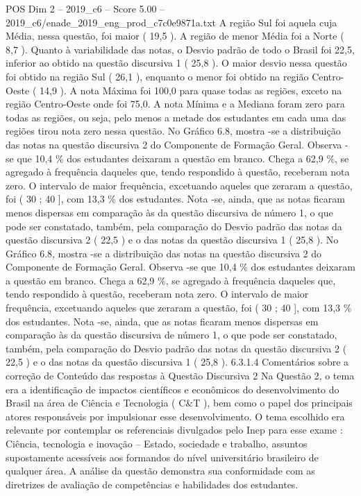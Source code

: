 \begin{textsample}{POS Dim 2 – 2019\_c6 – Score 5.00 – 2019\_c6/enade\_2019\_eng\_prod\_c7c0e9871a.txt}
A região Sul foi aquela cuja Média, nessa questão, foi maior ( 19,5 ).
A região de menor Média foi a Norte ( 8,7 ).
Quanto à variabilidade das notas, o Desvio padrão de todo o Brasil foi 22,5, inferior ao obtido na questão discursiva 1 ( 25,8 ).
O maior desvio nessa questão foi obtido na região Sul ( 26,1 ), enquanto o menor foi obtido na região Centro-Oeste ( 14,9 ).
A nota Máxima foi 100,0 para quase todas as regiões, exceto na região Centro-Oeste onde foi 75,0.
A nota Mínima e a Mediana foram zero para todas as regiões, ou seja, pelo menos a metade dos estudantes em cada uma das regiões tirou nota zero nessa questão.
No Gráfico 6.8, mostra -se a distribuição das notas na questão discursiva 2 do Componente de Formação Geral.
Observa -se que 10,4 \% dos estudantes deixaram a questão em branco.
Chega a 62,9 \%, se agregado à frequência daqueles que, tendo respondido à questão, receberam nota zero.
O intervalo de maior frequência, excetuando aqueles que zeraram a questão, foi ( 30 ; 40 ], com 13,3 \% dos estudantes.
Nota -se, ainda, que as notas ficaram menos dispersas em comparação às da questão discursiva de número 1, o que pode ser constatado, também, pela comparação do Desvio padrão das notas da questão discursiva 2 ( 22,5 ) e o das notas da questão discursiva 1 ( 25,8 ).
No Gráfico 6.8, mostra -se a distribuição das notas na questão discursiva 2 do Componente de Formação Geral.
Observa -se que 10,4 \% dos estudantes deixaram a questão em branco.
Chega a 62,9 \%, se agregado à frequência daqueles que, tendo respondido à questão, receberam nota zero.
O intervalo de maior frequência, excetuando aqueles que zeraram a questão, foi ( 30 ; 40 ], com 13,3 \% dos estudantes.
Nota -se, ainda, que as notas ficaram menos dispersas em comparação às da questão discursiva de número 1, o que pode ser constatado, também, pela comparação do Desvio padrão das notas da questão discursiva 2 ( 22,5 ) e o das notas da questão discursiva 1 ( 25,8 ). 6.3.1.4 Comentários sobre a correção de Conteúdo das respostas à Questão Discursiva 2 Na Questão 2, o tema era a identificação de impactos científicos e econômicos do desenvolvimento do Brasil na área de Ciência e Tecnologia ( C\&T ), bem como o papel dos principais atores responsáveis por impulsionar esse desenvolvimento.
O tema escolhido era relevante por contemplar os referenciais divulgados pelo Inep para esse exame : Ciência, tecnologia e inovação – Estado, sociedade e trabalho, assuntos supostamente acessíveis aos formandos do nível universitário brasileiro de qualquer área.
A análise da questão demonstra sua conformidade com as diretrizes de avaliação de competências e habilidades dos estudantes.

\end{textsample}
